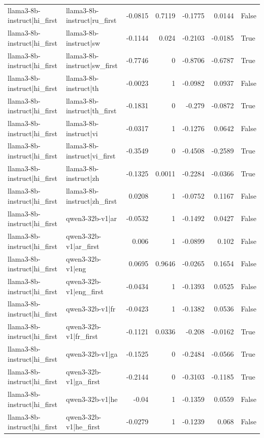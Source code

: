 \begin{table}
\begin{tabular}{l l r r r r l}
llama3-8b-instruct|hi_first & llama3-8b-instruct|ru_first & -0.0815 & 0.7119 & -0.1775 & 0.0144 & False \\
llama3-8b-instruct|hi_first & llama3-8b-instruct|sw & -0.1144 & 0.024 & -0.2103 & -0.0185 & True \\
llama3-8b-instruct|hi_first & llama3-8b-instruct|sw_first & -0.7746 & 0 & -0.8706 & -0.6787 & True \\
llama3-8b-instruct|hi_first & llama3-8b-instruct|th & -0.0023 & 1 & -0.0982 & 0.0937 & False \\
llama3-8b-instruct|hi_first & llama3-8b-instruct|th_first & -0.1831 & 0 & -0.279 & -0.0872 & True \\
llama3-8b-instruct|hi_first & llama3-8b-instruct|vi & -0.0317 & 1 & -0.1276 & 0.0642 & False \\
llama3-8b-instruct|hi_first & llama3-8b-instruct|vi_first & -0.3549 & 0 & -0.4508 & -0.2589 & True \\
llama3-8b-instruct|hi_first & llama3-8b-instruct|zh & -0.1325 & 0.0011 & -0.2284 & -0.0366 & True \\
llama3-8b-instruct|hi_first & llama3-8b-instruct|zh_first & 0.0208 & 1 & -0.0752 & 0.1167 & False \\
llama3-8b-instruct|hi_first & qwen3-32b-v1|ar & -0.0532 & 1 & -0.1492 & 0.0427 & False \\
llama3-8b-instruct|hi_first & qwen3-32b-v1|ar_first & 0.006 & 1 & -0.0899 & 0.102 & False \\
llama3-8b-instruct|hi_first & qwen3-32b-v1|eng & 0.0695 & 0.9646 & -0.0265 & 0.1654 & False \\
llama3-8b-instruct|hi_first & qwen3-32b-v1|eng_first & -0.0434 & 1 & -0.1393 & 0.0525 & False \\
llama3-8b-instruct|hi_first & qwen3-32b-v1|fr & -0.0423 & 1 & -0.1382 & 0.0536 & False \\
llama3-8b-instruct|hi_first & qwen3-32b-v1|fr_first & -0.1121 & 0.0336 & -0.208 & -0.0162 & True \\
llama3-8b-instruct|hi_first & qwen3-32b-v1|ga & -0.1525 & 0 & -0.2484 & -0.0566 & True \\
llama3-8b-instruct|hi_first & qwen3-32b-v1|ga_first & -0.2144 & 0 & -0.3103 & -0.1185 & True \\
llama3-8b-instruct|hi_first & qwen3-32b-v1|he & -0.04 & 1 & -0.1359 & 0.0559 & False \\
llama3-8b-instruct|hi_first & qwen3-32b-v1|he_first & -0.0279 & 1 & -0.1239 & 0.068 & False \\

\end{tabular}
\end{table}
